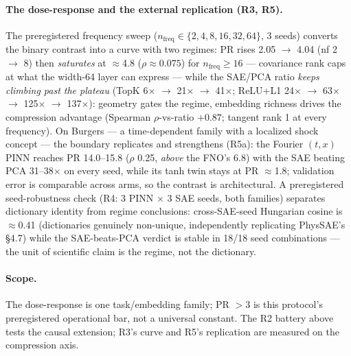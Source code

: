 \documentclass{article}
\begin{document}
\paragraph{The dose-response and the external replication (R3, R5).}
The preregistered frequency sweep ($n_{\mathrm{freq}} \in
\{2,4,8,16,32,64\}$, 3 seeds) converts the binary contrast into a
curve with two regimes: PR rises 2.05 $\to$ 4.04 (nf 2 $\to$ 8) then
\emph{saturates} at $\approx$4.8 ($\rho \approx 0.075$) for
$n_{\mathrm{freq}} \ge 16$ --- covariance rank caps at what the
width-64 layer can express --- while the SAE/PCA ratio \emph{keeps
climbing past the plateau} (TopK 6$\times$ $\to$ 21$\times$ $\to$
41$\times$; ReLU+L1 24$\times$ $\to$ 63$\times$ $\to$ 125$\times$
$\to$ 137$\times$): geometry gates the regime, embedding richness
drives the compression advantage (Spearman $\rho$-vs-ratio $+0.87$;
tangent rank 1 at every frequency). On Burgers --- a time-dependent
family with a localized shock concept --- the boundary replicates and
strengthens (R5a): the Fourier $(t,x)$ PINN reaches PR 14.0--15.8
($\rho$ 0.25, \emph{above} the FNO's 6.8) with the SAE beating PCA
31--38$\times$ on every seed, while its tanh twin stays at PR
$\approx$1.8; validation error is comparable across arms, so the
contrast is architectural. A preregistered seed-robustness check (R4:
3 PINN $\times$ 3 SAE seeds, both families) separates dictionary
identity from regime conclusions: cross-SAE-seed Hungarian cosine is
$\approx$0.41 (dictionaries genuinely non-unique, independently
replicating PhysSAE's \S4.7) while the SAE-beats-PCA verdict is
stable in 18/18 seed combinations --- the unit of scientific claim is
the regime, not the dictionary.

\paragraph{Scope.} The dose-response is one task/embedding family;
PR $> 3$ is this protocol's preregistered operational bar, not a
universal constant. The R2 battery above tests the causal extension;
R3's curve and R5's replication are measured on the compression axis.
\end{document}
